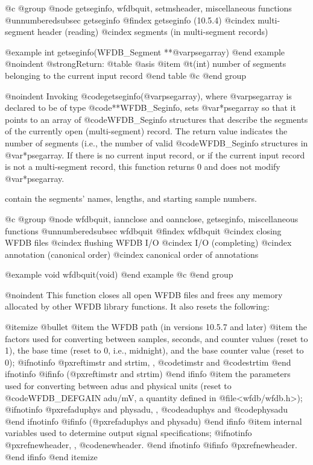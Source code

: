 {{{{{{{{@c @group
@node     getseginfo, wfdbquit, setmsheader, miscellaneous functions
@unnumberedsubsec getseginfo
@findex getseginfo (10.5.4)
@cindex multi-segment header (reading)
@cindex segments (in multi-segment records)

@example
int getseginfo(WFDB_Segment **@var{psegarray})
@end example
@noindent
@strong{Return:}
@table @asis
@item @t{(int)}
number of segments belonging to the current input record
@end table
@c @end group

@noindent
Invoking @code{getseginfo(@var{psegarray})}, where @var{psegarray} is
declared to be of type @code{**WFDB_Seginfo}, sets @var{*psegarray} so
that it points to an array of @code{WFDB_Seginfo} structures that
describe the segments of the currently open (multi-segment) record.
The return value indicates the number of segments (i.e., the number
of valid @code{WFDB_Seginfo} structures in @var{*psegarray}.  If
there is no current input record, or if the current input record is
not a multi-segment record, this function returns 0 and does not modify
@var{*psegarray}.

contain the segments' names, lengths, and starting sample numbers.

@c @group
@node     wfdbquit, iannclose and oannclose, getseginfo, miscellaneous functions
@unnumberedsubsec wfdbquit
@findex wfdbquit
@cindex closing WFDB files
@cindex flushing WFDB I/O
@cindex I/O (completing)
@cindex annotation (canonical order)
@cindex canonical order of annotations

@example
void wfdbquit(void)
@end example
@c @end group

@noindent
This function closes all open WFDB files and frees any memory allocated by
other WFDB library functions.  It also resets the following:

@itemize @bullet
@item
the WFDB path (in versions 10.5.7 and later)
@item
the factors used for converting between samples, seconds, and counter
values (reset to 1), the base time (reset to 0, i.e., midnight), and the
base counter value (reset to 0);
@ifnotinfo
@pxref{timstr and strtim, , @code{timstr} and @code{strtim}}
@end ifnotinfo
@ifinfo
(@pxref{timstr and strtim})
@end ifinfo
@item
the parameters used for converting between adus and physical units (reset to
@code{WFDB_DEFGAIN} adu/mV, a quantity defined in @file{<wfdb/wfdb.h>});
@ifnotinfo
@pxref{aduphys and physadu, , @code{aduphys} and @code{physadu}}
@end ifnotinfo
@ifinfo
(@pxref{aduphys and physadu})
@end ifinfo
@item
internal variables used to determine output signal specifications;
@ifnotinfo
@pxref{newheader, , @code{newheader}}.
@end ifnotinfo
@ifinfo
@pxref{newheader}.
@end ifinfo
@end itemize

}}}}}}}}
